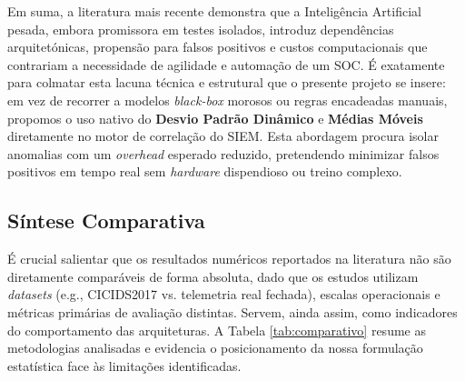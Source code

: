 \documentclass[12pt,a4paper]{article}
\begin{document}
Em suma, a literatura mais recente demonstra que a Inteligência Artificial pesada, embora promissora em testes isolados, introduz dependências arquitetónicas, propensão para falsos positivos e custos computacionais que contrariam a necessidade de agilidade e automação de um SOC. É exatamente para colmatar esta lacuna técnica e estrutural que o presente projeto se insere: em vez de recorrer a modelos \textit{black-box} morosos ou regras encadeadas manuais, propomos o uso nativo do \textbf{Desvio Padrão Dinâmico} e \textbf{Médias Móveis} diretamente no motor de correlação do SIEM. Esta abordagem procura isolar anomalias com um \textit{overhead} esperado reduzido, pretendendo minimizar falsos positivos em tempo real sem \textit{hardware} dispendioso ou treino complexo.

\subsection{Síntese Comparativa}
É crucial salientar que os resultados numéricos reportados na literatura não são diretamente comparáveis de forma absoluta, dado que os estudos utilizam \textit{datasets} (e.g., CICIDS2017 vs. telemetria real fechada), escalas operacionais e métricas primárias de avaliação distintas. Servem, ainda assim, como indicadores do comportamento das arquiteturas. A Tabela \ref{tab:comparativo} resume as metodologias analisadas e evidencia o posicionamento da nossa formulação estatística face às limitações identificadas.
\end{document}
